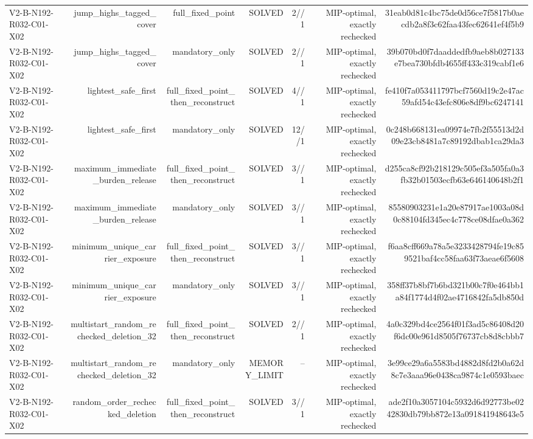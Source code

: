 {\begin{longtable}{lrrrrrr}
V2-B-N192-R032-C01-X02 & jump\_highs\_tagged\_cover & full\_fixed\_point & SOLVED & 2//1 & MIP-optimal, exactly rechecked & 31eab0d81c4bc75de0d56ce7f5817b0aecdb2a8f3c62faa43fec62641ef4f5b9 \\
V2-B-N192-R032-C01-X02 & jump\_highs\_tagged\_cover & mandatory\_only & SOLVED & 2//1 & MIP-optimal, exactly rechecked & 39b070bd0f7daaddedfb9aeb8b027133e7bea730bfdb4655ff433c319cabf1e6 \\
V2-B-N192-R032-C01-X02 & lightest\_safe\_first & full\_fixed\_point\_then\_reconstruct & SOLVED & 4//1 & MIP-optimal, exactly rechecked & fe410f7a053411797bcf7560d19c2e47ac59afd54c43efc806e8df9bc6247141 \\
V2-B-N192-R032-C01-X02 & lightest\_safe\_first & mandatory\_only & SOLVED & 12//1 & MIP-optimal, exactly rechecked & 0c248b668131ea09974e7fb2f55513d2d09e23cb8481a7c89192dbab1ca29da3 \\
V2-B-N192-R032-C01-X02 & maximum\_immediate\_burden\_release & full\_fixed\_point\_then\_reconstruct & SOLVED & 3//1 & MIP-optimal, exactly rechecked & d255ca8cf92b218129c505ef3a505fa0a3fb32b01503ecfb63e646140648b2f1 \\
V2-B-N192-R032-C01-X02 & maximum\_immediate\_burden\_release & mandatory\_only & SOLVED & 3//1 & MIP-optimal, exactly rechecked & 85580903231e1a20e87917ae1003a08d0c88104fd345ec4c778ce08dfae0a362 \\
V2-B-N192-R032-C01-X02 & minimum\_unique\_carrier\_exposure & full\_fixed\_point\_then\_reconstruct & SOLVED & 3//1 & MIP-optimal, exactly rechecked & f6aa8cff669a78a5e3233428794fe19c859521baf4cc58faa63f73aeae6f5608 \\
V2-B-N192-R032-C01-X02 & minimum\_unique\_carrier\_exposure & mandatory\_only & SOLVED & 3//1 & MIP-optimal, exactly rechecked & 358ff37b8bf7b6bd321b00c7f0e464bb1a84f1774d4f02ae4716842fa5db850d \\
V2-B-N192-R032-C01-X02 & multistart\_random\_rechecked\_deletion\_32 & full\_fixed\_point\_then\_reconstruct & SOLVED & 2//1 & MIP-optimal, exactly rechecked & 4a0c329bd4ce2564f01f3ad5c86408d20f6dc00e961d8505f76737cb8d8cbbb7 \\
V2-B-N192-R032-C01-X02 & multistart\_random\_rechecked\_deletion\_32 & mandatory\_only & MEMORY\_LIMIT & -- & MIP-optimal, exactly rechecked & 3e99ce29a6a5583bd4882d8fd2b0a62d8c7e3aaa96e0438ca9874c1e0593baec \\
V2-B-N192-R032-C01-X02 & random\_order\_rechecked\_deletion & full\_fixed\_point\_then\_reconstruct & SOLVED & 3//1 & MIP-optimal, exactly rechecked & ade2f10a3057104c5932d6d92773be0242830db79bb872e13a091841948643e5 \\

\end{longtable}}
